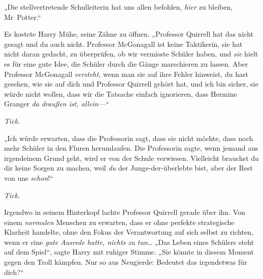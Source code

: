 „Die stellvertretende Schulleiterin hat uns allen befohlen, \emph{hier} zu bleiben, Mr~Potter.“

Es kostete Harry Mühe, seine Zähne zu öffnen.
„Professor Quirrell hat das nicht gesagt und du auch nicht. Professor McGonagall ist keine Taktikerin, sie hat nicht daran gedacht, zu überprüfen, ob wir vermisste Schüler haben, und \emph{sie} hielt es für eine gute Idee, die Schüler durch die Gänge marschieren zu lassen. Aber Professor McGonagall \emph{versteht}, wenn man sie auf ihre Fehler hinweist, du hast gesehen, wie sie auf dich und Professor Quirrell gehört hat, und ich bin sicher, sie würde nicht wollen, dass wir die Tatsache einfach ignorieren, dass Hermine Granger \emph{da draußen ist, allein—}“

\emph{Tick.}

„Ich würde erwarten, dass die Professorin sagt, dass sie nicht möchte, dass noch mehr Schüler in den Fluren herumlaufen. Die Professorin sagte, wenn jemand aus irgendeinem Grund geht, wird er von der Schule verwiesen. Vielleicht brauchst du dir keine Sorgen zu machen, weil \emph{du} der Junge-der-überlebte bist, aber der Rest von uns \emph{schon}!“

\emph{Tick.}

Irgendwo in seinem Hinterkopf lachte Professor Quirrell gerade über ihn. Von einem \emph{normalen} Menschen zu erwarten, dass er ohne perfekte strategische Klarheit handelte, ohne den Fokus der Verantwortung auf sich selbst zu richten, wenn er eine \emph{gute Ausrede hatte, nichts zu tun…}
„Das Leben eines Schülers steht auf dem Spiel“, sagte Harry mit ruhiger Stimme.
„Sie könnte in diesem Moment gegen den Troll kämpfen. Nur so aus Neugierde: Bedeutet das irgendetwas für dich?“

